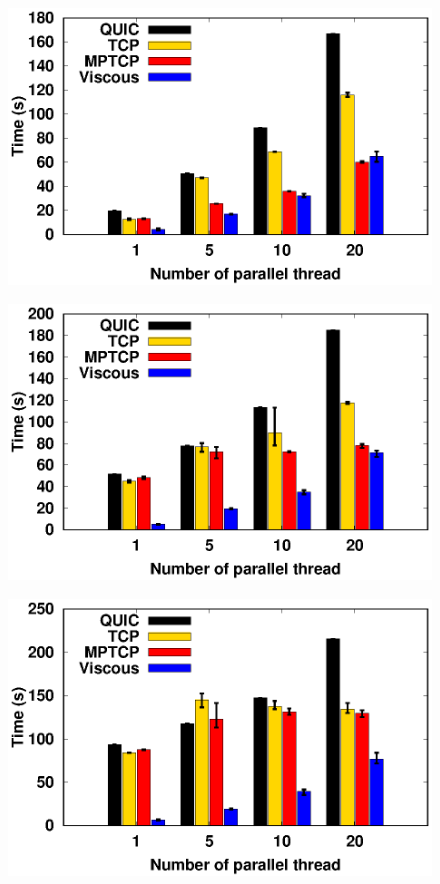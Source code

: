 \begin{figure}[!t]
    \begin{center}
        \begin{minipage}{0.45\linewidth}
            \centering
            \includegraphics[width=0.24\linewidth]{img/exp6/time_elapsed_1}
            \label{fig:exp6_time_16}
        \end{minipage}
        \begin{minipage}{0.45\linewidth}
            \centering
            \includegraphics[width=0.24\linewidth]{img/exp6/time_elapsed_5}
            \label{fig:exp6_time_80}
        \end{minipage}
        \begin{minipage}{0.45\linewidth}
            \centering
            \includegraphics[width=0.24\linewidth]{img/exp6/time_elapsed_10}
            \label{fig:exp6_time_160}

\end{minipage}
\end{center}
\end{figure}
